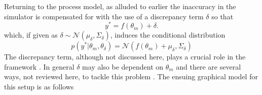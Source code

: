 \documentclass[10pt,a4paper]{article}
\newcommand{\intd} {\textrm{d}}
\begin{document}
Returning to the process model, as alluded to earlier the inaccuracy in the simulator is compensated for with the use of a discrepancy term $\delta$ so that
\begin{equation}
y^* = f(\theta_{m}) + \delta.
\end{equation}
\noindent which, if given as $\delta \sim \mathcal{N}(\mu_\delta,\Sigma_\delta)$, induces the conditional distribution 
\begin{equation}
p(y^* | \theta_m, \theta_\delta) = \mathcal{N}(f(\theta_m) + \mu_\delta, \Sigma_\delta)
\end{equation}
\noindent The discrepancy term, although not discussed here, plays a crucial role in the framework \citep{Brynjarsdottir_2013}. In general $\delta$ may also be dependent on $\theta_m$ and there are several ways, not reviewed here, to tackle this problem \citep[e.g.][]{Rougier_2007}. 
The ensuing graphical model for this setup is as follows
\begin{figure}[h!]
\centering
{}
\end{figure}
\end{document}

